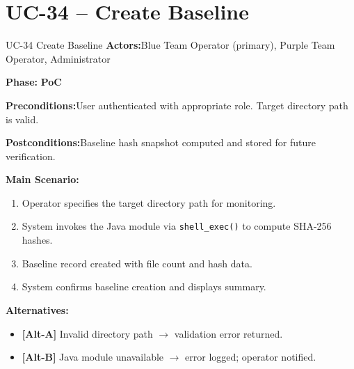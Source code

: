 \documentclass[12pt,a4paper]{report}
\newcommand{\ucfield}[2]{%
    \noindent\textbf{\color{helixpurplemid}#1:}\quad #2\par\medskip
}
\newcommand{\ucphase}[1]{%
    \noindent\textbf{\color{helixpurplemid}Phase:}\quad%
    \ifstrequal{#1}{PoC}{\textcolor{helixteal}{\textbf{PoC}}}{\textcolor{helixamber}{\textbf{Future MVP}}}%
    \par\medskip
}
\begin{document}
\section{UC-34 -- Create Baseline}
\begin{ucbox}{UC-34 \quad Create Baseline}
    \ucfield{Actors}{Blue Team Operator (primary), Purple Team Operator, Administrator}
    \ucphase{PoC}
    \ucfield{Preconditions}{User authenticated with appropriate role. Target directory path is valid.}
    \ucfield{Postconditions}{Baseline hash snapshot computed and stored for future verification.}
    \textbf{\color{helixpurplemid}Main Scenario:}
    \begin{enumerate}
        \item Operator specifies the target directory path for monitoring.
        \item System invokes the Java module via \texttt{shell\_exec()} to compute SHA-256 hashes.
        \item Baseline record created with file count and hash data.
        \item System confirms baseline creation and displays summary.
    \end{enumerate}
    \textbf{\color{helixpurplemid}Alternatives:}
    \begin{itemize}
        \item \textbf{[Alt-A]} Invalid directory path $\rightarrow$ validation error returned.
        \item \textbf{[Alt-B]} Java module unavailable $\rightarrow$ error logged; operator notified.
    \end{itemize}
\end{ucbox}
\end{document}
